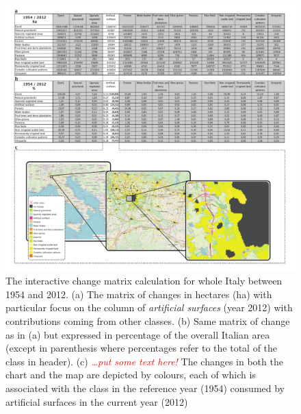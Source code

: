\documentclass[APA,LATO1COL,doublespace]{WileyNJD-v2}
\newcommand{\toberevised}[1]{\emph{\textcolor{red}{#1}}} %
\begin{document}
\begin{figure}[t] %
    \centerline{\includegraphics[width=450pt]{daMileti/04_caso_nazionale.pdf}}
    \caption{ The interactive change matrix calculation for whole Italy between 1954 and 2012.
    (a) The matrix of changes in hectares (ha) with particular focus on the column of \textit{artificial surfaces} (year 2012) with contributions coming from other classes.
    (b) Same matrix of change as in (a) but expressed in percentage of the overall Italian area (except in parenthesis where percentages refer to the total of the class in header).
    (c) \toberevised{\ldots put some text here!}
    The changes in both the chart and the map are depicted by colours, each of which is associated with the class in the reference year (1954) consumed by artificial surfaces in the current year (2012) } \label{fig:caseIT}
\end{figure}
\end{document}
